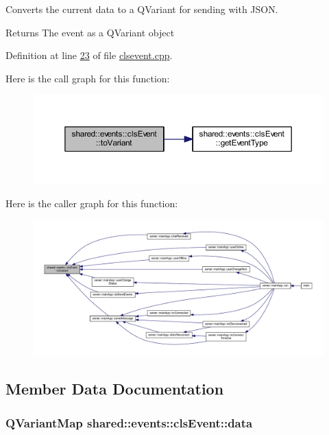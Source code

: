 Converts the current data to a Q\-Variant for sending with J\-S\-O\-N. 

\begin{DoxyReturn}{Returns}
The event as a Q\-Variant object 
\end{DoxyReturn}


Definition at line \hyperlink{clsevent_8cpp_source_l00023}{23} of file \hyperlink{clsevent_8cpp_source}{clsevent.\-cpp}.



Here is the call graph for this function\-:\nopagebreak
\begin{figure}[H]
\begin{center}
\leavevmode
\includegraphics[width=350pt]{db/d8b/classshared_1_1events_1_1cls_event_a48d11c9b50a2569c1065f19ca87d0715_cgraph}
\end{center}
\end{figure}




Here is the caller graph for this function\-:
\nopagebreak
\begin{figure}[H]
\begin{center}
\leavevmode
\includegraphics[width=350pt]{db/d8b/classshared_1_1events_1_1cls_event_a48d11c9b50a2569c1065f19ca87d0715_icgraph}
\end{center}
\end{figure}




\subsection{Member Data Documentation}
\hypertarget{classshared_1_1events_1_1cls_event_a6cfb6b96d72fc1e7a101e61061ec2755}{
\subsubsection[{data}]{\setlength{\rightskip}{0pt plus 5cm}Q\-Variant\-Map shared\-::events\-::cls\-Event\-::data\hspace{0.3cm}{\ttfamily [protected]}}}\label{db/d8b/classshared_1_1events_1_1cls_event_a6cfb6b96d72fc1e7a101e61061ec2755}


